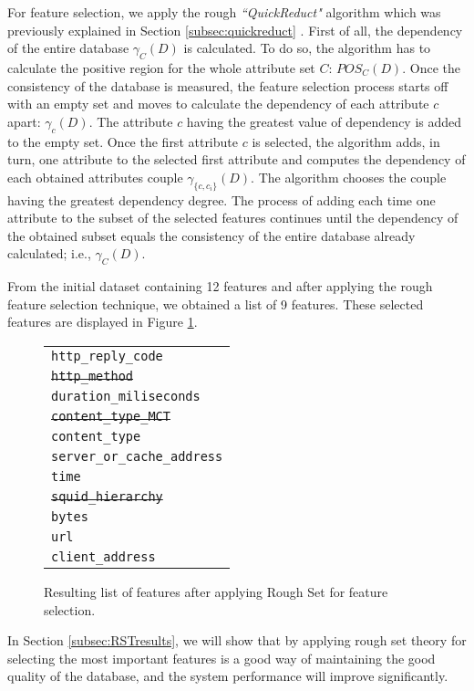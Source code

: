 \documentclass{llncs}
\begin{document}
For feature selection, we apply the rough \emph{``QuickReduct"} algorithm which was previously explained in Section \ref{subsec:quickreduct} . First of all, the dependency of the entire database $\gamma_{C}(D)$ is calculated. To do so, the algorithm has to calculate the positive region for the whole attribute set $C$: $POS_{C}(D)$. Once the consistency of the database is measured, the feature selection process starts off with an empty set and moves to calculate the dependency of each attribute $c$ apart: $\gamma_{c}(D)$. The attribute $c$ having the greatest value of dependency is added to the empty set. Once the first attribute $c$ is selected, the algorithm adds, in turn, one attribute to the selected first attribute and computes the dependency of each obtained attributes couple $\gamma_{\{c, c_{i}\}}(D)$. The algorithm chooses the couple having the greatest dependency degree. The process of adding each time one attribute to the subset of the selected features continues until the dependency of the obtained subset equals the consistency of the entire database already calculated; i.e., $\gamma_{C}(D)$.

From the initial dataset containing 12 features and after applying the rough feature selection technique, we obtained a list of 9 features. These selected features are displayed in Figure \ref{fig:data_9features}.

\begin{figure}[htb]
\centering
\begin{tabular}{ p{6cm} }
  \texttt{http\_reply\_code} \\
  \texttt{\st{http\_method}} \\
  \texttt{duration\_miliseconds} \\
  \texttt{\st{content\_type\_MCT}} \\
  \texttt{content\_type} \\
  \texttt{server\_or\_cache\_address} \\
  \texttt{time} \\
  \texttt{\st{squid\_hierarchy}} \\
  \texttt{bytes} \\
  \texttt{url} \\
  \texttt{client\_address} \\
\end{tabular}
\caption{Resulting list of features after applying Rough Set for feature selection.\label{fig:data_9features}}
\end{figure}

In Section \ref{subsec:RSTresults}, we will show that by applying rough set theory for selecting the most important features is a good way of maintaining the good quality of the database, and the system performance will improve significantly.
\end{document}
